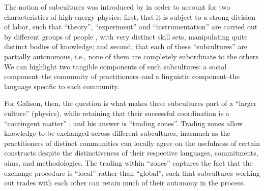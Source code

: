 \documentclass[smallextended]{svjour3}
\begin{document}
The notion of subcultures was introduced by \citet{galison1987how,Galison1988} in order to account for two characteristics of high-energy physics: first, that it is subject to a strong division of labor, such that ``theory'', ``experiment'' and ``instrumentation'' are carried out by different groups of people \citep[p.~138]{galison1987how}, with very distinct skill sets, manipulating quite distinct bodies of knowledge; and second, that each of these ``subcultures'' are partially autonomous, i.e., none of them are completely subordinate to the others. We can highlight two tangible components of such subcultures: a social component--the community of practitioners--and a linguistic component--the language specific to each community.

For Galison, then, the question is what makes these subcultures part of a ``larger culture'' (physics), %
while retaining that their successful coordination is a ``contingent matter'' \citep[p.~18]{galison1997image}; and his answer is ``trading zones''. Trading zones allow knowledge to be exchanged across different subcultures, inasmuch as the practitioners of distinct communities can locally agree on the usefulness of certain constructs despite the distinctiveness of their respective languages, commitments, aims, and methodologies. The trading within ``zones'' captures the fact that the exchange procedure is  ``local'' rather than ``global'', such that subcultures working out trades with each other can retain much of their autonomy in the process.%
\end{document}
